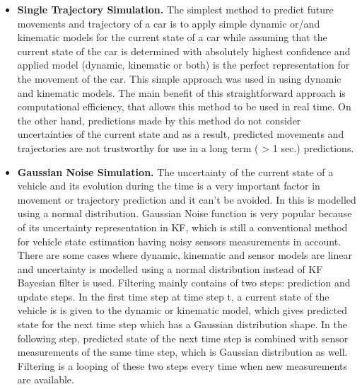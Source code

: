 \begin{itemize}
	\item \textbf{Single Trajectory Simulation.} The simplest method to predict future movements and trajectory of a car is to apply simple dynamic or/and kinematic models for the current state of a car while assuming that the current state of the car is determined with absolutely highest confidence and applied model (dynamic, kinematic or both) is the perfect representation for the movement of the car. This simple approach was used in \cite{dynamic} using dynamic and \cite{kinematicI, kinematicII} kinematic models. The main benefit of this straightforward approach is computational efficiency, that allows this method to be used in real time. On the other hand, predictions made by this method do not consider uncertainties of the current state and as a result, predicted movements and trajectories are not trustworthy for use in a long term ( > 1 sec.) predictions.
	\item \textbf{Gaussian Noise Simulation.} The uncertainty of the current state of a vehicle and its evolution during the time is a very important factor in movement or trajectory prediction and it can't be avoided. In \cite{GaussianNoiseI, GaussianNoiseII, kinematicII} this is modelled using a normal distribution. Gaussian Noise function is very popular because of its uncertainty representation in \gls{KF}, which is still a conventional method for vehicle state estimation having noisy sensors measurements in account. There are some cases where dynamic, kinematic and sensor models are linear and uncertainty is modelled using a normal distribution instead of \gls{KF} Bayesian filter is used. Filtering mainly contains of two steps: prediction and update steps. In the first time step at time step t, a current state of the vehicle is is given to the dynamic or kinematic model, which gives predicted state for the next time step which has a Gaussian distribution shape. In the following step, predicted state of the next time step is combined with sensor measurements of the same time step, which is Gaussian distribution as well. Filtering is a looping of these two steps every time when new measurements are available.
	

\end{itemize}
